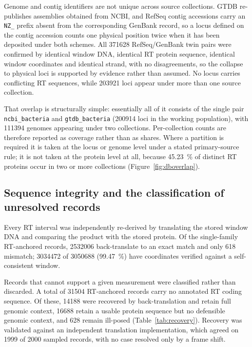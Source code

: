 Genome and contig identifiers are not unique across source collections. GTDB re-publishes assemblies
obtained from NCBI, and RefSeq contig accessions carry an \texttt{NZ\_} prefix absent from the
corresponding GenBank record, so a locus defined on the contig accession counts one physical
position twice when it has been deposited under both schemes. All \num{371628} RefSeq/GenBank twin
pairs were confirmed by identical window DNA, identical RT protein sequence, identical window
coordinates and identical strand, with no disagreements, so the collapse to physical loci is
supported by evidence rather than assumed. No locus carries conflicting RT sequences, while
\num{203921} loci appear under more than one source collection.

That overlap is structurally simple: essentially all of it consists of the single pair
\texttt{ncbi\_bacteria} and \texttt{gtdb\_bacteria} (\num{200914} loci in the working population),
with \num{111394} genomes appearing under two collections. Per-collection counts are therefore
reported as coverage rather than as shares. Where a partition is required it is taken at the locus
or genome level under a stated primary-source rule; it is not taken at the protein level at all,
because \SI{45.23}{\percent} of distinct RT proteins occur in two or more collections
(Figure~\ref{fig:dboverlap}).

\subsection{Sequence integrity and the classification of unresolved records}
\label{sec:dbchar:integrity}

Every RT interval was independently re-derived by translating the stored window DNA and comparing
the product with the stored protein. Of the single-family RT-anchored records, \num{2532006}
back-translate to an exact match and only 618 mismatch; \num{3034472} of \num{3050688}
(\SI{99.47}{\percent}) have coordinates verified against a self-consistent window.

Records that cannot support a given measurement were classified rather than discarded. A total of
\num{31504} RT-anchored records carry no annotated RT coding sequence. Of these, \num{14188} were
recovered by back-translation and retain full genomic context, \num{16688} retain a usable protein
sequence but no defensible genomic context, and 628 remain ill-posed
(Table~\ref{tab:recovery}). Recovery was validated against an independent translation
implementation, which agreed on \num{1999} of \num{2000} sampled records, with no case resolved only
by a frame shift.

